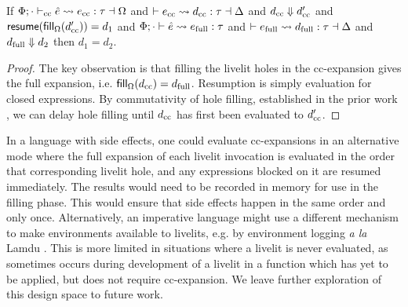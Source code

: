 \begin{theorem}
    If $\Phi; \cdot \vdash_\text{cc} \hat e \leadsto e_\text{cc} : \tau \dashv \Omega$ and $\vdash e_\text{cc} \leadsto d_\text{cc} : \tau \dashv \Delta$
    and $d_\text{cc} \Downarrow d_\text{cc}'$ and $\mathsf{resume}(\mathsf{fill}_{\Omega}(d_\text{cc}')) = d_1$
    and $\Phi; \cdot \vdash \hat e \leadsto e_\text{full} : \tau$
    and $\vdash e_\text{full} \leadsto d_\text{full} : \tau \dashv \Delta$
    and $d_\text{full} \Downarrow d_2$ then $d_1 = d_2$.
\end{theorem}
\begin{proof}
    The key observation is that filling the livelit holes in the cc-expansion gives the full expansion,
    i.e. $\mathsf{fill}_{\Omega}(d_\text{cc}) = d_\text{full}$. Resumption is simply evaluation for closed expressions.
    By commutativity of hole filling, established in the prior work \cite{HazelnutLive},
    we can delay hole filling until $d_\text{cc}$ has first been evaluated to
    $d_\text{cc}'$.
\end{proof}

In a language with side effects, one could evaluate 
cc-expansions in an alternative mode where the full expansion of each livelit invocation is evaluated 
in the order that corresponding livelit hole, and any expressions blocked on it are resumed immediately. 
The results would need to be recorded in memory for use in the filling phase. This would ensure that
side effects happen in the same order and only once. %
Alternatively, an imperative language might use a different mechanism to make
environments available to livelits, e.g. by environment logging \emph{a la} Lamdu \cite{lamdu}.
This is more limited in situations where a livelit is never evaluated, as sometimes 
occurs during development of a livelit in a function which has yet to be applied, 
but does not require cc-expansion. We leave further exploration of this design space 
to future work.




